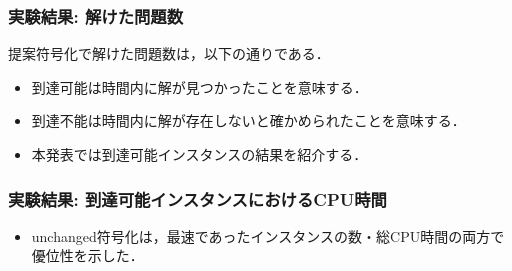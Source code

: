 \documentclass[dvipdfmx,11pt]{beamer}
\begin{document}

\begin{frame}\frametitle{実験結果: 解けた問題数}

提案符号化で解けた問題数は，以下の通りである．
\bigskip

\begin{exampleblock}{}\centering
  
\end{exampleblock}

  
  \begin{itemize}
    \item 到達可能は時間内に解が見つかったことを意味する．
    \item 到達不能は時間内に解が存在しないと確かめられたことを意味する．
    \item 本発表では到達可能インスタンスの結果を紹介する．
  \end{itemize}

\end{frame}

\begin{frame}\frametitle{実験結果: 到達可能インスタンスにおけるCPU時間}

  \begin{table}[t]
    \centering
      
  \end{table}

  \begin{itemize}
    \item unchanged符号化は，最速であったインスタンスの数・総CPU時間の両方で優位性を示した．
  \end{itemize}
  
\end{frame}

\end{document}
